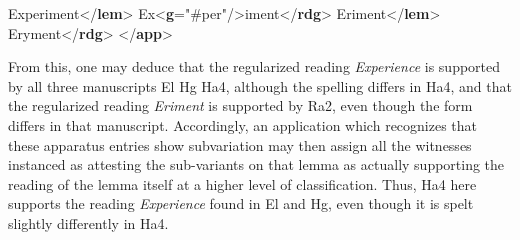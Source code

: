 \begin{shaded}
\hspace*{1em}Experiment{</\textbf{lem}>}\mbox{}\newline 
\hspace*{1em}Ex{<\textbf{g}\hspace*{1em}{ref}="{\#per}"/>}iment{</\textbf{rdg}>}\mbox{}\newline 
{}\mbox{}\newline 
{}\mbox{}\newline 
\hspace*{1em}Eriment{</\textbf{lem}>}\mbox{}\newline 
\hspace*{1em}Eryment{</\textbf{rdg}>}\mbox{}\newline 
{}\mbox{}\newline 
{</\textbf{app}>}\end{shaded}\egroup\par \noindent  From this, one may deduce that the regularized reading \textit{Experience} is supported by all three manuscripts El Hg Ha4, although the spelling differs in Ha4, and that the regularized reading \textit{Eriment} is supported by Ra2, even though the form differs in that manuscript. Accordingly, an application which recognizes that these apparatus entries show subvariation may then assign all the witnesses instanced as attesting the sub-variants on that lemma as actually supporting the reading of the lemma itself at a higher level of classification. Thus, Ha4 here supports the reading \textit{Experience} found in El and Hg, even though it is spelt slightly differently in Ha4.\par
